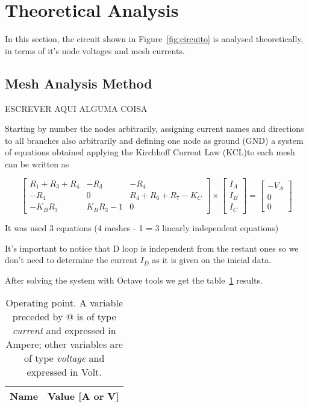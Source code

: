 \section{Theoretical Analysis}
\label{sec:analysis}

\hspace{0,5cm} In this section, the circuit shown in Figure~\ref{fig:circuito} is analysed
theoretically, in terms of it's node voltages and mesh currents.

\subsection{Mesh Analysis Method}

\hspace{0,5cm} ESCREVER AQUI ALGUMA COISA

Starting by number the nodes arbitrarily, assigning current names and directions to all branches also arbitrarily and defining one node as ground (GND) a system of equations obtained applying the Kirchhoff Current Law (KCL)to each mesh can be written as 

\begin{equation}
\begin{bmatrix} 
R_1 + R_3 + R_4 & -R_3 & -R_4 \\ 
-R_4 & 0 & R_4 + R_6 + R_7 - K_C\\
-K_B R_3 & K_B R_3 - 1 & 0
\end{bmatrix} 
\times
\begin{bmatrix} 
I_A \\ 
I_B \\ 
I_C
\end{bmatrix} =
\begin{bmatrix} 
-V_A \\ 
0 \\ 
0
\end{bmatrix}
\end{equation}

It was used 3 equations (4 meshes - 1 = 3 linearly independent equations)

It's important to notice that D loop is independent from the restant ones so we don't need to determine the current $I_D$ as it is given on the inicial data.
  
After solving the system with Octave tools we get the table~\ref{tab:mesh} results.

\begin{table}[h]
  \centering
  \begin{tabular}{|l|r|}
    \hline    
    {\bf Name} & {\bf Value [A or V]} \\ \hline
    
  \end{tabular}
  \caption{Operating point. A variable preceded by @ is of type {\em current} and expressed in Ampere; other variables are of type {\it voltage} and expressed in Volt.}
  \label{tab:mesh}
\end{table}


